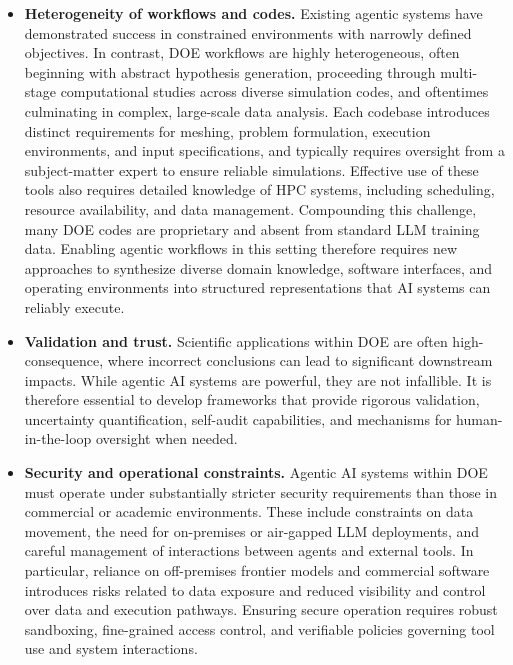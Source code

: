 \documentclass[11pt]{article} \usepackage[margin=1in]{geometry}
\begin{document}
\begin{itemize} \item \textbf{Heterogeneity of workflows and codes.} Existing
agentic systems have demonstrated success in constrained environments with
narrowly defined objectives. In contrast, DOE workflows are highly
heterogeneous, often beginning with abstract hypothesis generation, proceeding
through multi-stage computational studies across diverse simulation codes, and
oftentimes culminating in complex, large-scale data analysis. Each codebase
introduces distinct requirements for meshing, problem formulation, execution
environments, and input specifications, and typically requires oversight from a
subject-matter expert to ensure reliable simulations. Effective use of these
tools also requires detailed knowledge of HPC systems, including scheduling,
resource availability, and data management. Compounding this challenge, many DOE
codes are proprietary and absent from standard LLM training data. Enabling
agentic workflows in this setting therefore requires new approaches to
synthesize diverse domain knowledge, software interfaces, and operating
environments into structured representations that AI systems can reliably
execute.

    \item \textbf{Validation and trust.} Scientific applications within DOE are
often high-consequence, where incorrect conclusions can lead to significant
downstream impacts. While agentic AI systems are powerful, they are not
infallible. It is therefore essential to develop frameworks that provide
rigorous validation, uncertainty quantification, self-audit capabilities, and
mechanisms for human-in-the-loop oversight when needed.

    \item \textbf{Security and operational constraints.} Agentic AI systems
within DOE must operate under substantially stricter security requirements than
those in commercial or academic environments. These include constraints on data
movement, the need for on-premises or air-gapped LLM deployments, and careful
management of interactions between agents and external tools. In particular,
reliance on off-premises frontier models and commercial software introduces
risks related to data exposure and reduced visibility and control over data and
execution pathways. Ensuring secure operation requires robust sandboxing,
fine-grained access control, and verifiable policies governing tool use and
system interactions.  \end{itemize}
\end{document}
